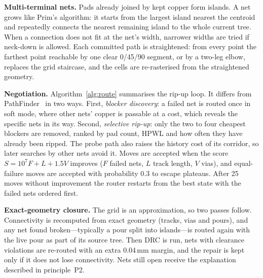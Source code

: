 \documentclass[journal]{IEEEtran}
\begin{document}
\textbf{Multi-terminal nets.} Pads already joined by kept copper form islands. A net grows like Prim's algorithm: it starts from the largest island nearest the centroid and repeatedly connects the nearest remaining island to the whole current tree. When a connection does not fit at the net's width, narrower widths are tried if neck-down is allowed. Each committed path is straightened: from every point the farthest point reachable by one clear 0/45/90\textdegree{} segment, or by a two-leg elbow, replaces the grid staircase, and the cells are re-rasterised from the straightened geometry.

\textbf{Negotiation.} Algorithm~\ref{alg:route} summarises the rip-up loop. It differs from PathFinder~\cite{mcmurchie1995} in two ways. First, \emph{blocker discovery}: a failed net is routed once in soft mode, where other nets' copper is passable at a cost, which reveals the specific nets in its way. Second, \emph{selective rip-up}: only the two to four cheapest blockers are removed, ranked by pad count, HPWL and how often they have already been ripped. The probe path also raises the history cost of its corridor, so later searches by other nets avoid it. Moves are accepted when the score $S = 10^7 F + L + 1.5V$ improves ($F$ failed nets, $L$ track length, $V$ vias), and equal-failure moves are accepted with probability $0.3$ to escape plateaus. After 25 moves without improvement the router restarts from the best state with the failed nets ordered first.

\textbf{Exact-geometry closure.} The grid is an approximation, so two passes follow. Connectivity is recomputed from exact geometry (tracks, vias and pours), and any net found broken---typically a pour split into islands---is routed again with the live pour as part of its source tree. Then DRC is run, nets with clearance violations are re-routed with an extra 0.04\,mm margin, and the repair is kept only if it does not lose connectivity. Nets still open receive the explanation described in principle~P2.
\end{document}
